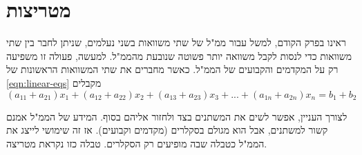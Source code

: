 \documentclass[
  hebrew,
  12pt,
  a4paper,
  oneside]{book}
\theoremstyle{definition}
\theoremstyle{remark}
\theoremstyle{plain}
\theoremstyle{remark}
\begin{document}
\section{מטריצות}\label{ux5deux5d8ux5e8ux5d9ux5e6ux5d5ux5ea}

ראינו בפרק הקודם, למשל עבור ממ"ל של שתי משוואות בשני נעלמים, שניתן לחבר
בין שתי משוואות כדי לנסות לקבל משוואה יותר פשוטה שנובעת מהממ"ל. למעשה,
פעולה זו משפיעה רק על המקדמים והקבועים של הממ"ל. כאשר מחברים את שתי
המשוואות הראשונות של \ref{eqn:linear-eqs} מקבלים
\[(a_{11}+a_{21})x_1+(a_{12}+a_{22})x_2+(a_{13}+a_{23})x_3+...+(a_{1n}+a_{2n})x_n=b_1+b_2\]

לצורך העניין, אפשר לשים את המשתנים בצד ולחזור אליהם בסוף. המידע של הממ"ל
אמנם קשור למשתנים, אבל הוא מגולם בסקלרים (מקדמים וקבועים). אז זה שימושי
לייצג את הממ"ל כטבלה שבה מופיעים רק הסקלרים. טבלה כזו נקראת מטריצה.
\end{document}
